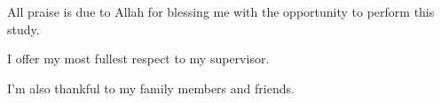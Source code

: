 

\chapter*{}

All praise is due to Allah for blessing me with the opportunity to perform this study. 

I offer my most fullest respect to my supervisor.

I'm also thankful to my family members and friends.